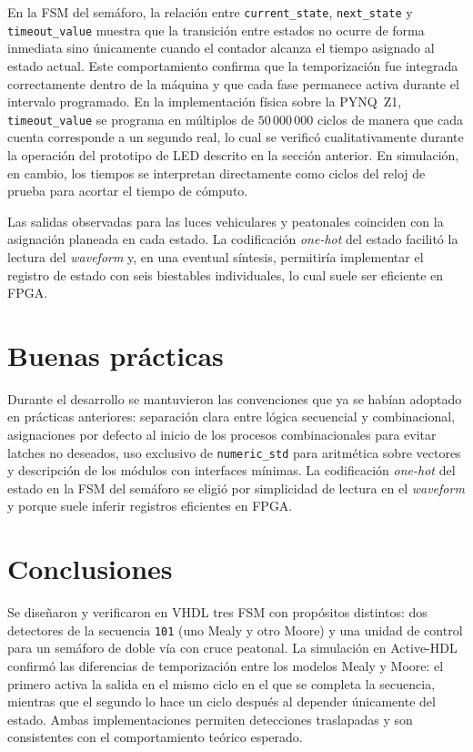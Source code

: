 \documentclass[12pt,letterpaper]{article}
\begin{document}
En la FSM del semáforo, la relación entre \texttt{current\_state}, \texttt{next\_state} y \texttt{timeout\_value} muestra que la transición entre estados no ocurre de forma inmediata sino únicamente cuando el contador alcanza el tiempo asignado al estado actual. Este comportamiento confirma que la temporización fue integrada correctamente dentro de la máquina y que cada fase permanece activa durante el intervalo programado. En la implementación física sobre la PYNQ~Z1, \texttt{timeout\_value} se programa en múltiplos de $50\,000\,000$ ciclos de manera que cada cuenta corresponde a un segundo real, lo cual se verificó cualitativamente durante la operación del prototipo de LED descrito en la sección anterior. En simulación, en cambio, los tiempos se interpretan directamente como ciclos del reloj de prueba para acortar el tiempo de cómputo.

Las salidas observadas para las luces vehiculares y peatonales coinciden con la asignación planeada en cada estado. La codificación \textit{one-hot} del estado facilitó la lectura del \textit{waveform} y, en una eventual síntesis, permitiría implementar el registro de estado con seis biestables individuales, lo cual suele ser eficiente en FPGA.

\section{Buenas prácticas}
Durante el desarrollo se mantuvieron las convenciones que ya se habían adoptado en prácticas anteriores: separación clara entre lógica secuencial y combinacional, asignaciones por defecto al inicio de los procesos combinacionales para evitar latches no deseados, uso exclusivo de \texttt{numeric\_std} para aritmética sobre vectores y descripción de los módulos con interfaces mínimas. La codificación \textit{one-hot} del estado en la FSM del semáforo se eligió por simplicidad de lectura en el \textit{waveform} y porque suele inferir registros eficientes en FPGA.

\section{Conclusiones}
Se diseñaron y verificaron en VHDL tres FSM con propósitos distintos: dos detectores de la secuencia \texttt{101} (uno Mealy y otro Moore) y una unidad de control para un semáforo de doble vía con cruce peatonal. La simulación en Active-HDL confirmó las diferencias de temporización entre los modelos Mealy y Moore: el primero activa la salida en el mismo ciclo en el que se completa la secuencia, mientras que el segundo lo hace un ciclo después al depender únicamente del estado. Ambas implementaciones permiten detecciones traslapadas y son consistentes con el comportamiento teórico esperado.
\end{document}
